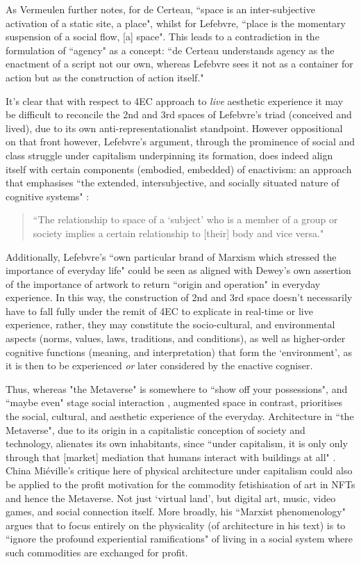 As Vermeulen further notes, for de Certeau, ``space is an inter-subjective activation of a static site, a place", whilst for Lefebvre, ``place is the momentary suspension of a social flow, [a] space". This leads to a contradiction in the formulation of ``agency" as a concept: ``de Certeau understands agency as the enactment of a script not our own, whereas Lefebvre sees it not as a container for action but as the construction of action itself." 

It's clear that with respect to 4EC approach to \textit{live} aesthetic experience it may be difficult to reconcile the 2nd and 3rd spaces of Lefebvre's triad (conceived and lived), due to its own anti-representationalist standpoint. However oppositional on that front however, Lefebvre's argument, through the prominence of social and class struggle under capitalism underpinning its formation, does indeed align itself with certain components (embodied, embedded) of enactivism: an approach that emphasises ``the extended, intersubjective, and socially situated nature of cognitive systems" \citep[p. 6]{gallagher2017}: 
\begin{quote}
    ``The relationship to space of a `subject' who is a member of a group or society implies a certain relationship to [their] body and vice versa." \cite[p. 40]{lefebvre1991}
\end{quote}
Additionally, Lefebvre's ``own particular brand of Marxism which stressed the importance of everyday life" \citep[p. 8]{merrifield1993} could be seen as aligned with Dewey's own assertion of the importance of artwork to return ``origin and operation" in everyday experience. In this way, the construction of 2nd and 3rd space doesn't necessarily have to fall fully under the remit of 4EC to explicate in real-time or live experience, rather, they may constitute the socio-cultural, and environmental aspects (norms, values, laws, traditions, and  conditions), as well as higher-order cognitive functions (meaning, and interpretation) that form the `environment', as it is then to be experienced \textit{or} later considered by the enactive cogniser.

Thus, whereas "the Metaverse" is somewhere to ``show off your possessions", and ``maybe even" stage social interaction \citep{marr2022}, augmented space in contrast, prioritises the social, cultural, and aesthetic experience of the everyday. Architecture in ``the Metaverse", due to its origin in a capitalistic conception of society and technology, alienates its own inhabitants, since ``under capitalism, it is only only through that [market] mediation that humans interact with buildings at all" \citep[p. 18]{mieville1998}. China Miéville's critique here of physical architecture under capitalism could also be applied to the profit motivation for the commodity fetishisation of art in NFTs and hence the Metaverse. Not just `virtual land', but digital art, music, video games, and social connection itself. More broadly, his ``Marxist phenomenology" argues that to focus entirely on the physicality (of architecture in his text) is to ``ignore the profound experiential ramifications" of living in a social system where such commodities are exchanged for profit. 

